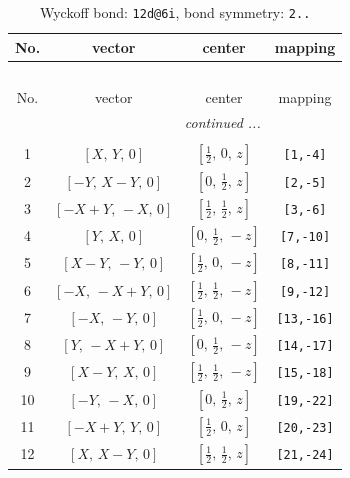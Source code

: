 \documentclass[fleqn,8pt]{jsarticle}
\begin{document}
\begin{longtable}{cccc}
\caption{Wyckoff bond: {\tt 12d@6i}, bond symmetry: {\tt 2..}}
 \\
 \hline \hline
No. & vector & center & mapping \\ \hline \endfirsthead

\multicolumn{3}{l}{\tablename\ \thetable{}} \\
 \hline \hline
No. & vector & center & mapping \\ \hline \endhead

 \hline \hline
\multicolumn{3}{r}{\footnotesize\it continued ...} \\ \endfoot

 \hline \hline
\multicolumn{3}{r}{} \\ \endlastfoot

1 & $\left[ X,\, Y,\, 0 \right]$ & $\left[ \frac{1}{2},\, 0,\, z \right]$ & {\tt [1,-4]} \\ \hline
2 & $\left[ - Y,\, X - Y,\, 0 \right]$ & $\left[ 0,\, \frac{1}{2},\, z \right]$ & {\tt [2,-5]} \\ \hline
3 & $\left[ - X + Y,\, - X,\, 0 \right]$ & $\left[ \frac{1}{2},\, \frac{1}{2},\, z \right]$ & {\tt [3,-6]} \\ \hline
4 & $\left[ Y,\, X,\, 0 \right]$ & $\left[ 0,\, \frac{1}{2},\, - z \right]$ & {\tt [7,-10]} \\ \hline
5 & $\left[ X - Y,\, - Y,\, 0 \right]$ & $\left[ \frac{1}{2},\, 0,\, - z \right]$ & {\tt [8,-11]} \\ \hline
6 & $\left[ - X,\, - X + Y,\, 0 \right]$ & $\left[ \frac{1}{2},\, \frac{1}{2},\, - z \right]$ & {\tt [9,-12]} \\ \hline
7 & $\left[ - X,\, - Y,\, 0 \right]$ & $\left[ \frac{1}{2},\, 0,\, - z \right]$ & {\tt [13,-16]} \\ \hline
8 & $\left[ Y,\, - X + Y,\, 0 \right]$ & $\left[ 0,\, \frac{1}{2},\, - z \right]$ & {\tt [14,-17]} \\ \hline
9 & $\left[ X - Y,\, X,\, 0 \right]$ & $\left[ \frac{1}{2},\, \frac{1}{2},\, - z \right]$ & {\tt [15,-18]} \\ \hline
10 & $\left[ - Y,\, - X,\, 0 \right]$ & $\left[ 0,\, \frac{1}{2},\, z \right]$ & {\tt [19,-22]} \\ \hline
11 & $\left[ - X + Y,\, Y,\, 0 \right]$ & $\left[ \frac{1}{2},\, 0,\, z \right]$ & {\tt [20,-23]} \\ \hline
12 & $\left[ X,\, X - Y,\, 0 \right]$ & $\left[ \frac{1}{2},\, \frac{1}{2},\, z \right]$ & {\tt [21,-24]} \\
\end{longtable}
\end{document}

